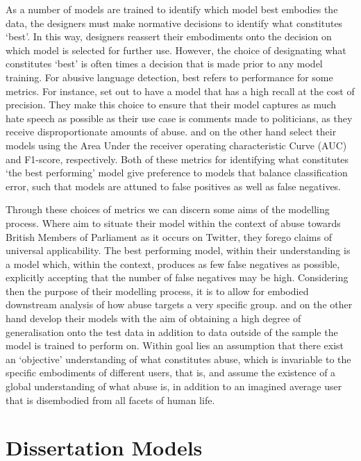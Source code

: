 As a number of models are trained to identify which model best embodies the data, the designers must make normative decisions to identify what constitutes `best'. In this way, designers reassert their embodiments onto the decision on which model is selected for further use. However, the choice of designating what constitutes `best' is often times a decision that is made prior to any model training. For abusive language detection, best refers to performance for some metrics. For instance, \citet{Gorrell:2018} set out to have a model that has a high recall at the cost of precision. They make this choice to ensure that their model captures as much hate speech as possible as their use case is comments made to politicians, as they receive disproportionate amounts of abuse. \citet{Wulczyn:2016} and \citet{Kshirsagar:2018} on the other hand select their models using the Area Under the receiver operating characteristic Curve (AUC) and F1-score, respectively. Both of these metrics for identifying what constitutes `the best performing' model give preference to models that balance classification error, such that models are attuned to false positives as well as false negatives.

Through these choices of metrics we can discern some aims of the modelling process. Where \citet{Gorrell:2018} aim to situate their model within the context of abuse towards British Members of Parliament as it occurs on Twitter, they forego claims of universal applicability. The best performing model, within their understanding is a model which, within the context, produces as few false negatives as possible, explicitly accepting that the number of false negatives may be high. Considering then the purpose of their modelling process, it is to allow for embodied downstream analysis of how abuse targets a very specific group. \citet{Wulczyn:2016} and \citet{Kshirsagar:2018} on the other hand develop their models with the aim of obtaining a high degree of generalisation onto the test data in addition to data outside of the sample the model is trained to perform on. Within goal lies an assumption that there exist an `objective' understanding of what constitutes abuse, which is invariable to the specific embodiments of different users, that is, \citet{Wulczyn:2016} and \citet{Kshirsagar:2018} assume the existence of a global understanding of what abuse is, in addition to an imagined average user that is disembodied from all facets of human life.

\section{Dissertation Models}

